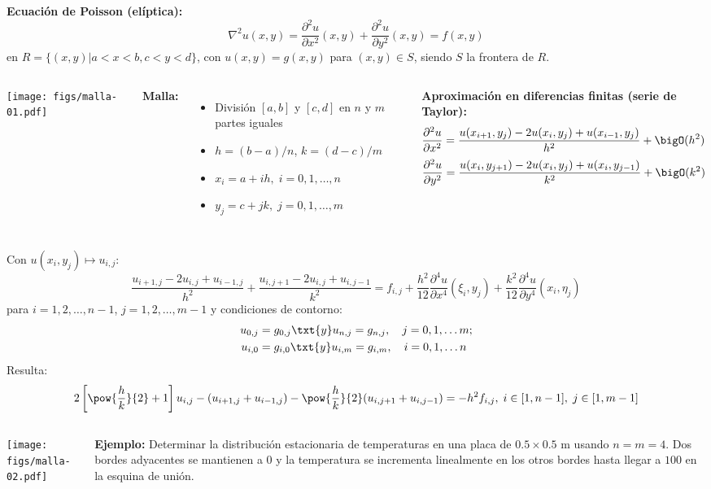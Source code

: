 \documentclass[9pt, aspectratio=169]{beamer}
\begin{document}
\begin{frame}
\textbf{Ecuación de Poisson (elíptica):}
\[ \nabla^2 u(x, y) = \frac{\partial^2 u}{\partial x^2}(x, y) + \frac{\partial^2 u}{\partial y^2}(x, y) = f(x, y) \]
en $R = \{(x, y) | a < x < b, c < y < d \}$, con $u(x, y) = g(x, y)$ para $(x, y) \in S$, siendo $S$ la frontera de $R$.
\begin{columns}
\cx
\begin{center}
    \texttt{[image: figs/malla-01.pdf]}
\end{center}
\cx
\textbf{Malla:}
\begin{itemize}
    \item División $[a, b]$ y $[c, d]$ en $n$ y $m$ partes iguales
    \item $h = (b - a) / n$, $k = (d - c) / m$
    \item $x_i = a + i h, \; i = 0, 1, \ldots, n$
    \item $y_j = c + j k, \; j = 0, 1, \ldots, m$
\end{itemize}

\textbf{Aproximación en diferencias finitas (serie de Taylor):}
\[ \frac{\partial^2 u}{\partial x^2} = \frac{u(x_{i+1}, y_j) - 2 u(x_i, y_j) + u(x_{i-1},y_j)}{h^2} + \bigO(h^2) \]
\[ \frac{\partial^2 u}{\partial y^2} = \frac{u(x_i, y_{j+1}) - 2 u(x_i, y_j) + u(x_i,y_{j-1})}{k^2} + \bigO(k^2) \]
\end{columns}
\end{frame}

\begin{frame}
    Con $u(x_i, y_j) \mapsto u_{i,j}$:
    \[ \frac{u_{i+1, j} - 2 u_{i,j} + u_{i-1, j}}{h^2} + \frac{u_{i, j+1} - 2 u_{i,j} + u_{i, j-1}}{k^2} = f_{i, j} + \frac{h^2}{12} \frac{\partial^4 u}{\partial x^4}(\xi_i, y_j) + \frac{k^2}{12} \frac{\partial^4 u}{\partial y^4}(x_i, \eta_j) \]
    para $i = 1, 2, \ldots, n-1$, $j = 1, 2, \ldots, m-1$ y condiciones de contorno:
\begin{align*}
    u_{0, j} &= g_{0, j} \txt{y} u_{n, j} = g_{n, j}, \quad j = 0, 1, \ldots m; \\
    u_{i, 0} &= g_{i, 0} \txt{y} u_{i, m} = g_{i, m}, \quad i = 0, 1, \ldots n
\end{align*}
Resulta:
\[ 2 \left[ \pow{\frac{h}{k}}{2} + 1 \right]  u_{i,j} - (u_{i+1, j} + u_{i-1,j}) - \pow{\frac{h}{k}}{2} (u_{i, j+1} + u_{i, j-1}) = -h^2 f_{i,j}, \; i \in [1, n-1], \; j \in [1, m-1] \]
\begin{columns}
\cx
    \begin{center}
        \texttt{[image: figs/malla-02.pdf]}
    \end{center}
\cx
\vspace{1em} \pause

\textbf{Ejemplo:} Determinar la distribución estacionaria de temperaturas en una placa de $0.5 \times 0.5$ m usando $n = m = 4$. Dos bordes adyacentes se mantienen a $0$ \textcelsius{} y la temperatura se incrementa linealmente en los otros bordes hasta llegar a $100$ \textcelsius{} en la esquina de unión.
\end{columns}
\end{frame}
\end{document}
